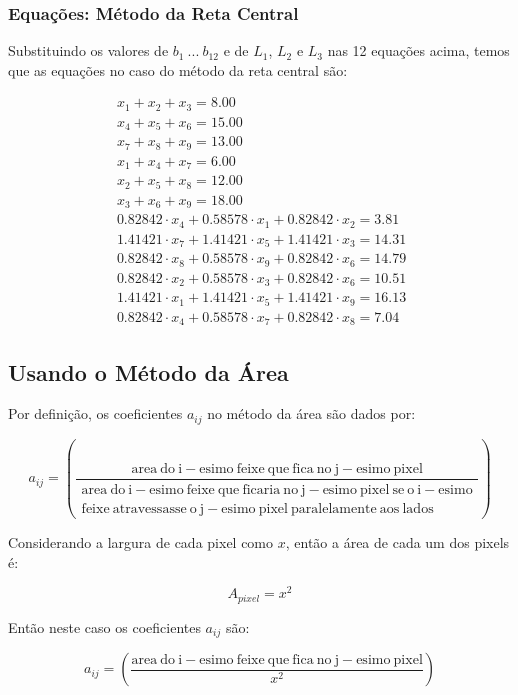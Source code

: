 \documentclass[a4paper, 12pt]{article}
\begin{document}
\subsubsection{Equações: Método da Reta Central}
Substituindo os valores de $b_1\ ...\ b_12$ e de $L_1$, $L_2$ e $L_3$ nas 12 equações acima, temos que as equações no caso do método da reta central são:

$$\boxed{\ \ \begin{matrix}
x_1+x_2+x_3=8.00\\
x_4+x_5+x_6=15.00\\
x_7+x_8+x_9=13.00\\
x_1+x_4+x_7=6.00\\
x_2+x_5+x_8=12.00\\
x_3+x_6+x_9=18.00\\
0.82842\cdot x_4+0.58578\cdot x_1+0.82842\cdot x_2=3.81\\
1.41421\cdot x_7+1.41421\cdot x_5+1.41421\cdot x_3=14.31\\
0.82842\cdot x_8+0.58578\cdot x_9+0.82842\cdot x_6=14.79\\
0.82842\cdot x_2+0.58578\cdot x_3+0.82842\cdot x_6=10.51\\
1.41421\cdot x_1+1.41421\cdot x_5+1.41421\cdot x_9=16.13\\
0.82842\cdot x_4+0.58578\cdot x_7+0.82842\cdot x_8=7.04
\end{matrix}\ }$$

\subsection{Usando o Método da Área}

Por definição, os coeficientes $a_{ij}$ no método da área são dados por:

$$a_{ij}=\left(\frac{\mathrm{area\ do\ i-esimo\ feixe\ que\ fica\ no\ j-esimo\ pixel}}{\begin{matrix}
\mathrm{area\ do\ i-esimo\ feixe\ que\ ficaria\ no\ j-esimo\ pixel\ se\ o\ i-esimo}\\
\mathrm{feixe\ atravessasse\ o\ j-esimo\ pixel\ paralelamente\ aos\ lados}
\end{matrix}}\right)$$

Considerando a largura de cada pixel como $x$, então a área de cada um dos pixels é:

$$A_{pixel}=x^2$$

Então neste caso os coeficientes $a_{ij}$ são:

$$a_{ij}=\left(\frac{\mathrm{area\ do\ i-esimo\ feixe\ que\ fica\ no\ j-esimo\ pixel}}{x^2}\right)$$
\end{document}
